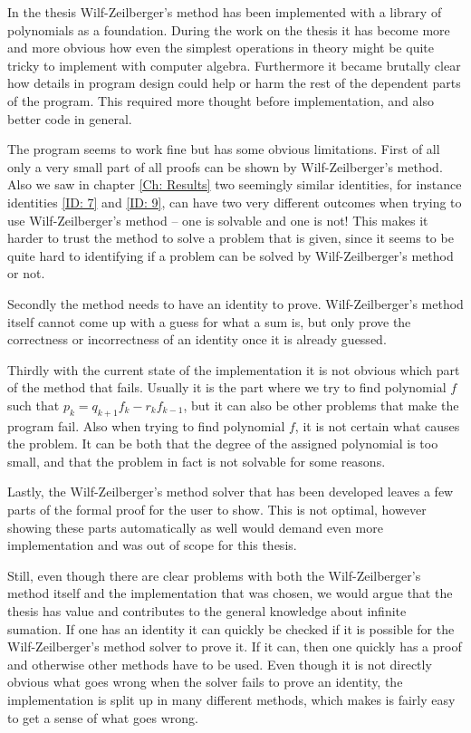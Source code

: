 In the thesis Wilf-Zeilberger's method has been implemented with a library of polynomials as a foundation. During the work on the thesis it has become more and more obvious how even the simplest operations in theory might be quite tricky to implement with computer algebra. Furthermore it became brutally clear how details in program design could help or harm the rest of the dependent parts of the program. This required more thought before implementation, and also better code in general.

The program seems to work fine but has some obvious limitations. First of all only a very small part of all proofs can be shown by Wilf-Zeilberger's method. Also we saw in chapter \ref{Ch: Results} two seemingly similar identities, for instance identities \ref{ID: 7} and \ref{ID: 9}, can have two very different outcomes when trying to use Wilf-Zeilberger's method -- one is solvable and one is not! This makes it harder to trust the method to solve a problem that is given, since it seems to be quite hard to identifying if a problem can be solved by Wilf-Zeilberger's method or not.

Secondly the method needs to have an identity to prove. Wilf-Zeilberger's method itself cannot come up with a guess for what a sum is, but only prove the correctness or incorrectness of an identity once it is already guessed.

Thirdly with the current state of the implementation it is not obvious which part of the method that fails. Usually it is the part where we try to find polynomial $f$ such that $p_k=q_{k+1}f_k-r_kf_{k-1}$, but it can also be other problems that make the program fail. Also when trying to find polynomial $f$, it is not certain what causes the problem. It can be both that the degree of the assigned polynomial is too small, and that the problem in fact is not solvable for some reasons.

Lastly, the Wilf-Zeilberger's method solver that has been developed leaves a few parts of the formal proof for the user to show. This is not optimal, however showing these parts automatically as well would demand even more implementation and was out of scope for this thesis.

Still, even though there are clear problems with both the Wilf-Zeilberger's method itself and the implementation that was chosen, we would argue that the thesis has value and contributes to the general knowledge about infinite sumation. If one has an identity it can quickly be checked if it is possible for the Wilf-Zeilberger's method solver to prove it. If it can, then one quickly has a proof and otherwise other methods have to be used. Even though it is not directly obvious what goes wrong when the solver fails to prove an identity, the implementation is split up in many different methods, which makes is fairly easy to get a sense of what goes wrong.

